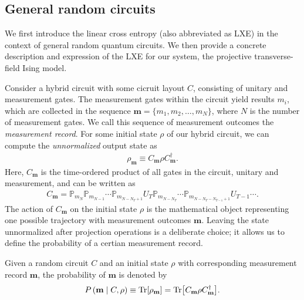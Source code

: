 \subsection{General random circuits}
We first introduce the linear cross entropy (also abbreviated as LXE) in the
context of general random quantum circuits. We then provide a concrete
description and expression of the LXE for our system, the projective
transverse-field Ising model.

Consider a hybrid circuit with some cicruit layout $C$, consisting of unitary
and measurement gates. The measurement gates within the circuit yield results
$m_i$, which are collected in the sequence $\mathbf{m} = \{m_1, m_2, \ldots,
m_N\}$, where $N$ is the number of measurement gates. We call this sequence of
measurement outcomes the \emph{measurement record}. For some initial state
$\rho$ of our hybrid circuit, we can compute the \emph{unnormalized} output
state as
\begin{align}\label{eq:rho-m}
  \rho_\mathbf{m} \equiv C_\mathbf{m} \rho C^\dagger_\mathbf{m}
.\end{align}
Here, $C_\mathbf{m}$ is the time-ordered product of all gates in the circuit,
unitary and measurement, and can be written as
\cite{liCrossEntropyBenchmark2023}
\begin{align}
  C_\mathbf{m} = \mathbb{P}_{m_N} \mathbb{P}_{m_{N-1}} \cdots
  \mathbb{P}_{m_{N-N_T+1}} U_T \mathbb{P}_{m_{N-N_T}} \cdots
  \mathbb{P}_{m_{N-N_T-N_{T-1}+1}} U_{T-1} \cdots
.\end{align}
The action of $C_\mathbf{m}$ on the initial state
$\rho$ is the mathematical object representing one possible trajectory with
measurement outcomes $\mathbf{m}$. Leaving the state unnormalized after 
projection operations is a deliberate choice; it allows us to define the
probability of a certian measurement record.

\begin{defn}\label{defn:prob-traj}
  Given a random circuit $C$ and an initial state $\rho$ with corresponding
  measurement record $\mathbf{m}$, the probability of $\mathbf{m}$ is denoted
  by
  \begin{align}\label{eq:prob-traj-defn}
    P\left( \mathbf{m} \mid C, \rho \right) \equiv \Tr[\rho_\mathbf{m}] =
    \Tr[C_\mathbf{m} \rho C^\dagger_\mathbf{m}]
  .\end{align}
\end{defn}

